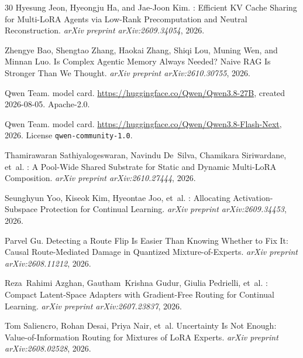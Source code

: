 \documentclass[11pt,a4paper]{article}
\begin{document}
\begin{thebibliography}{30}
Hyesung Jeon, Hyeongju Ha, and Jae-Joon Kim.
: Efficient {KV} Cache Sharing for Multi-{LoRA} Agents via Low-Rank Precomputation and Neutral Reconstruction.
\newblock \emph{arXiv preprint arXiv:2609.34054}, 2026.

Zhengye Bao, Shengtao Zhang, Haokai Zhang, Shiqi Lou, Muning Wen, and Minnan Luo.
\newblock Is Complex Agentic Memory Always Needed? Naive {RAG} Is Stronger Than We Thought.
\newblock \emph{arXiv preprint arXiv:2610.30755}, 2026.

{Qwen Team}.
 model card.
\newblock \url{https://huggingface.co/Qwen/Qwen3.8-27B}, created 2026-08-05. Apache-2.0.

{Qwen Team}.
 model card.
\newblock \url{https://huggingface.co/Qwen/Qwen3.8-Flash-Next}, 2026. License \texttt{qwen-community-1.0}.

Thamirawaran Sathiyalogeswaran, Navindu De~Silva, Chamikara Siriwardane, et~al.
: A Pool-Wide Shared Substrate for Static and Dynamic Multi-{LoRA} Composition.
\newblock \emph{arXiv preprint arXiv:2610.27444}, 2026.

Seunghyun Yoo, Kiseok Kim, Hyeontae Joo, et~al.
: Allocating Activation-Subspace Protection for Continual Learning.
\newblock \emph{arXiv preprint arXiv:2609.34453}, 2026.

Parvel Gu.
\newblock Detecting a Route Flip Is Easier Than Knowing Whether to Fix It: Causal Route-Mediated Damage in Quantized Mixture-of-Experts.
\newblock \emph{arXiv preprint arXiv:2608.11212}, 2026.

Reza~Rahimi Azghan, Gautham~Krishna Gudur, Giulia Pedrielli, et~al.
: Compact Latent-Space Adapters with Gradient-Free Routing for Continual Learning.
\newblock \emph{arXiv preprint arXiv:2607.23837}, 2026.

Tom Saliencro, Rohan Desai, Priya Nair, et~al.
\newblock Uncertainty Is Not Enough: Value-of-Information Routing for Mixtures of {LoRA} Experts.
\newblock \emph{arXiv preprint arXiv:2608.02528}, 2026.


\end{thebibliography}
\end{document}
